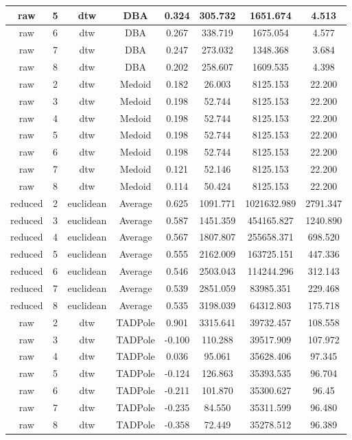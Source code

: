 \documentclass[9pt,journal,compsoc]{IEEEtran}
\begin{document}
\begin{table}[t]
\begin{tabular}{|c|c|c|c|c|c|c|c|}
		raw & 5 & dtw & DBA & 0.324 & 305.732 & 1651.674 & 4.513 \\ \hline
		raw & 6 & dtw & DBA & 0.267 & 338.719 & 1675.054 & 4.577 \\ \hline
		raw & 7 & dtw & DBA & 0.247 & 273.032 & 1348.368 & 3.684 \\ \hline
		raw & 8 & dtw & DBA & 0.202 & 258.607 & 1609.535 & 4.398 \\ \hline
		raw & 2 & dtw & Medoid & 0.182 & 26.003 & 8125.153 & 22.200 \\ \hline
		raw & 3 & dtw & Medoid & 0.198 & 52.744 & 8125.153 & 22.200 \\ \hline
		raw & 4 & dtw & Medoid & 0.198 & 52.744 & 8125.153 & 22.200 \\ \hline
		raw & 5 & dtw & Medoid & 0.198 & 52.744 & 8125.153 & 22.200 \\ \hline
		raw & 6 & dtw & Medoid & 0.198 & 52.744 & 8125.153 & 22.200 \\ \hline
		raw & 7 & dtw & Medoid & 0.121 & 52.146 & 8125.153 & 22.200 \\ \hline
		raw & 8 & dtw & Medoid & 0.114 & 50.424 & 8125.153 & 22.200 \\ \hline
		reduced & 2 & euclidean & Average & 0.625 & 1091.771 & 1021632.989 & 2791.347 \\ \hline
		reduced & 3 & euclidean & Average & 0.587 & 1451.359 & 454165.827 & 1240.890 \\ \hline
		reduced & 4 & euclidean & Average & 0.567 & 1807.807 & 255658.371 & 698.520 \\ \hline
		reduced & 5 & euclidean & Average & 0.555 & 2162.009 & 163725.151 & 447.336 \\ \hline
		reduced & 6 & euclidean & Average & 0.546 & 2503.043 & 114244.296 & 312.143 \\ \hline
		reduced & 7 & euclidean & Average & 0.539 & 2851.059 & 83985.351 & 229.468 \\ \hline
		reduced & 8 & euclidean & Average & 0.535 & 3198.039 & 64312.803 & 175.718 \\ \hline
		raw & 2 & dtw & TADPole & 0.901 & 3315.641 & 39732.457 & 108.558 \\ \hline
		raw & 3 & dtw & TADPole & -0.100 & 110.288 & 39517.909 & 107.972 \\ \hline
		raw & 4 & dtw & TADPole & 0.036 & 95.061 & 35628.406 & 97.345 \\ \hline
		raw & 5 & dtw & TADPole & -0.124 & 126.863 & 35393.535 & 96.704 \\ \hline
		raw & 6 & dtw & TADPole & -0.211 & 101.870 & 35300.627 & 96.45 \\ \hline
		raw & 7 & dtw & TADPole & -0.235 & 84.550 & 35311.599 & 96.480 \\ \hline
		raw & 8 & dtw & TADPole & -0.358 & 72.449 & 35278.512 & 96.389 \\ \hline
	\end{tabular}
\end{table}
\end{document}
